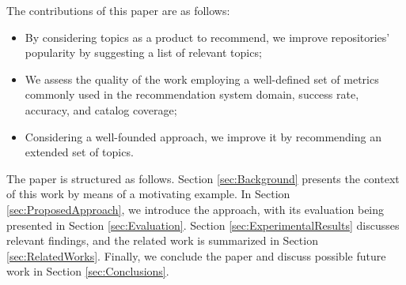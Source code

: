 
The contributions of this paper are as follows:
\begin{itemize}
	\item By considering \GH topics as a product to recommend, we improve 
	repositories' popularity by suggesting a list of relevant topics;
	\item We assess the quality of the work employing a well-defined set of 
	metrics commonly used in the recommendation system domain, \ie success rate, 
	accuracy, and catalog coverage;
	\item Considering a well-founded approach, we improve it by recommending an 
	extended set of topics.  
\end{itemize}

The paper is structured as follows. Section \ref{sec:Background} presents the 
context of this work by means of a motivating example. In Section 
\ref{sec:ProposedApproach}, we introduce the \TF approach, with its evaluation being 
presented in Section \ref{sec:Evaluation}. Section 
\ref{sec:ExperimentalResults} discusses relevant findings, and the related work is 
summarized in  Section \ref{sec:RelatedWorks}. Finally, we conclude the paper 
and discuss possible future work in Section \ref{sec:Conclusions}.
